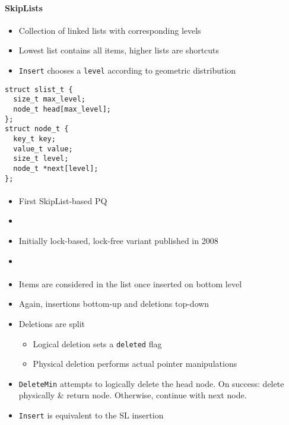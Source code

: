 \documentclass[usenames,dvipsnames]{beamer}
\begin{document}
\begin{frame}[fragile]{}
\framesubtitle{SkipLists}

\begin{itemize}
\item Collection of linked lists with corresponding levels
\item Lowest list contains all items, higher lists are shortcuts
\item \lstinline|Insert| chooses a \lstinline|level| according to geometric distribution
\end{itemize}

\begin{lstlisting}
struct slist_t {
  size_t max_level;
  node_t head[max_level];
};
struct node_t {
  key_t key;
  value_t value;
  size_t level;
  node_t *next[level];
};
\end{lstlisting}
\end{frame}


\begin{frame}{}
\framesubtitle{\citeauthor{shavit2000skiplist}}

\begin{itemize}
\item First SkipList-based PQ
\item {}
\item Initially lock-based, lock-free variant published in 2008
\item {}
\end{itemize}
\end{frame}

\begin{frame}{}
\framesubtitle{\citeauthor{shavit2000skiplist}}

\begin{itemize}
\item Items are considered in the list once inserted on bottom level
\item Again, insertions bottom-up and deletions top-down
\item Deletions are split
    \begin{itemize}
    \item Logical deletion sets a \lstinline|deleted| flag
    \item Physical deletion performs actual pointer manipulations
    \end{itemize}
\item \lstinline|DeleteMin| attempts to logically delete the head node.
     On success: delete physically \& return node. Otherwise, continue with
     next node.
\item \lstinline|Insert| is equivalent to the SL insertion
\end{itemize}
\end{frame}
\end{document}

